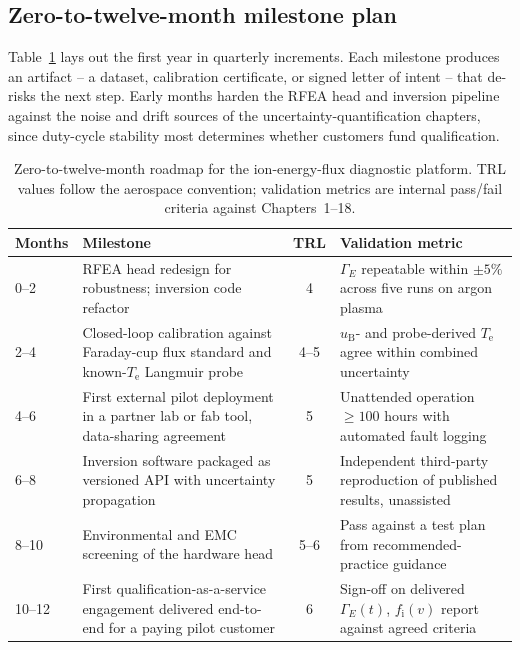 \subsection{Zero-to-twelve-month milestone plan}

Table~\ref{tab:milestones} lays out the first year in quarterly increments. Each milestone produces an artifact -- a dataset, calibration certificate, or signed letter of intent -- that de-risks the next step. Early months harden the RFEA head and inversion pipeline against the noise and drift sources of the uncertainty-quantification chapters, since duty-cycle stability most determines whether customers fund qualification.

\begin{table}[htbp]
\centering
\caption{Zero-to-twelve-month roadmap for the ion-energy-flux diagnostic platform. TRL values follow the aerospace convention; validation metrics are internal pass/fail criteria against Chapters~1--18.}
\label{tab:milestones}
\begin{tabularx}{\textwidth}{@{}l l c X@{}}
\toprule
Months & Milestone & TRL & Validation metric \\
\midrule
0--2 & RFEA head redesign for robustness; inversion code refactor & 4 & $\Gamma_{E}$ repeatable within $\pm 5\%$ across five runs on argon plasma \\
2--4 & Closed-loop calibration against Faraday-cup flux standard and known-$T_{\mathrm{e}}$ Langmuir probe & 4--5 & $u_{\mathrm{B}}$- and probe-derived $T_{\mathrm{e}}$ agree within combined uncertainty \\
4--6 & First external pilot deployment in a partner lab or fab tool, data-sharing agreement & 5 & Unattended operation $\geq 100$ hours with automated fault logging \\
6--8 & Inversion software packaged as versioned API with uncertainty propagation & 5 & Independent third-party reproduction of published results, unassisted \\
8--10 & Environmental and EMC screening of the hardware head & 5--6 & Pass against a test plan from recommended-practice guidance \\
10--12 & First qualification-as-a-service engagement delivered end-to-end for a paying pilot customer & 6 & Sign-off on delivered $\Gamma_{E}(t)$, $f_{\mathrm{i}}(v)$ report against agreed criteria \\
\bottomrule
\end{tabularx}
\end{table}

